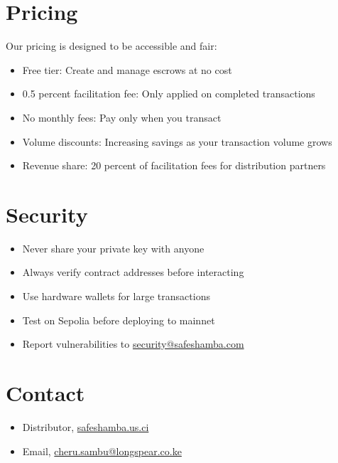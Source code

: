 \documentclass[11pt]{article}
\begin{document}
\section{Pricing}
Our pricing is designed to be accessible and fair:

\begin{itemize}
\item Free tier: Create and manage escrows at no cost
\item 0.5 percent facilitation fee: Only applied on completed transactions
\item No monthly fees: Pay only when you transact
\item Volume discounts: Increasing savings as your transaction volume grows
\item Revenue share: 20 percent of facilitation fees for distribution partners
\end{itemize}

\section{Security}
\begin{itemize}
\item Never share your private key with anyone
\item Always verify contract addresses before interacting
\item Use hardware wallets for large transactions
\item Test on Sepolia before deploying to mainnet
\item Report vulnerabilities to \href{mailto:security@safeshamba.com}{security@safeshamba.com}
\end{itemize}

\section{Contact}
\begin{itemize}
\item Distributor, \href{https://safeshamba.us.ci}{safeshamba.us.ci}
\item Email, \href{mailto:cheru.sambu@longspear.co.ke}{cheru.sambu@longspear.co.ke}
\end{itemize}
\end{document}
